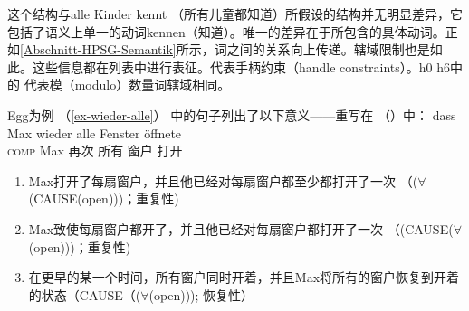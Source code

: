 这个结构与alle Kinder kennt （所有儿童都知道）所假设的结构并无明显差异，它包括了语义上单一的动词kennen（知道）。唯一的差异在于所包含的具体动词。正如\ref{Abschnitt-HPSG-Semantik}所示，词之间的关系向上传递。辖域限制也是如此。这些信息都在列表中进行表征。\hcons 代表手柄约束（handle constraints）。h0 \qeq h6中的 \qeq 代表模（modulo）数量词辖域相同。

Egg为例 （\ref{ex-wieder-alle}） 中的句子列出了以下意义——重写在 （）中：
\ea
\label{ex-wieder-alle-zwei}
\gll dass Max wieder alle Fenster öffnete\\
	 \textsc{comp} Max 再次 所有 窗户 打开\\
\z
\begin{enumerate}
\item Max打开了每扇窗户，并且他已经对每扇窗户都至少都打开了一次 （($\forall$(CAUSE(open)))；重复性)
\item Max致使每扇窗户都开了，并且他已经对每扇窗户都打开了一次 （(CAUSE($\forall$(open)))；重复性)
\item 在更早的某一个时间，所有窗户同时开着，并且Max将所有的窗户恢复到开着的状态（CAUSE（($\forall$(open))); 恢复性）
\end{enumerate}

